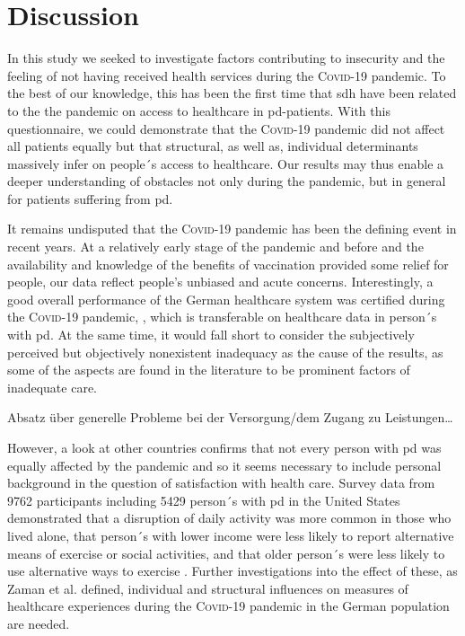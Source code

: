 \documentclass{bmcart}
\begin{document}
\newpage

\section*{Discussion}
In this study we seeked to investigate factors contributing to insecurity and the feeling of not having received health services during the \textsc{Covid}-19 pandemic. To the best of our knowledge, this has been the first time that \ac{sdh} have been related to the the pandemic on access to healthcare in \ac{pd}-patients. With this questionnaire, we could demonstrate that the \textsc{Covid}-19 pandemic did not affect all patients equally but that structural, as well as, individual determinants massively infer on people´s access to healthcare. Our results may thus enable a deeper understanding of obstacles not only during the pandemic, but in general for patients suffering from \ac{pd}. 

It remains undisputed that the \textsc{Covid}-19 pandemic has been the defining event in recent years. At a relatively early stage of the pandemic and before and the availability and knowledge of the benefits of vaccination provided some relief for people, our data reflect people's unbiased and acute concerns. Interestingly, a good overall performance of the German healthcare system was certified during the \textsc{Covid}-19 pandemic, \cite{10665-341674}, which is transferable on healthcare data in person´s with \ac{pd}\cite{frundt2022impact}. At the same time, it would fall short to consider the subjectively perceived but objectively nonexistent inadequacy as the cause of the results, as some of the aspects are found in the literature to be prominent factors of inadequate care. 

Absatz über generelle Probleme bei der Versorgung/dem Zugang zu Leistungen\ldots

However, a look at other countries confirms that not every person with \ac{pd} was equally affected by the pandemic and so it seems necessary to include personal background in the question of satisfaction with health care. Survey data from 9762 participants including 5429 person´s with \ac{pd} in the United States demonstrated that a disruption of daily activity was more common in those who lived alone, that person´s with lower income were less likely to report alternative means of exercise or social activities, and that older person´s were less likely to use alternative ways to exercise \cite{brown2020effect}. Further investigations into the effect of these, as Zaman et al. defined, individual and structural influences on  measures of healthcare experiences during the \textsc{Covid}-19 pandemic in the German population are needed.
\end{document}
